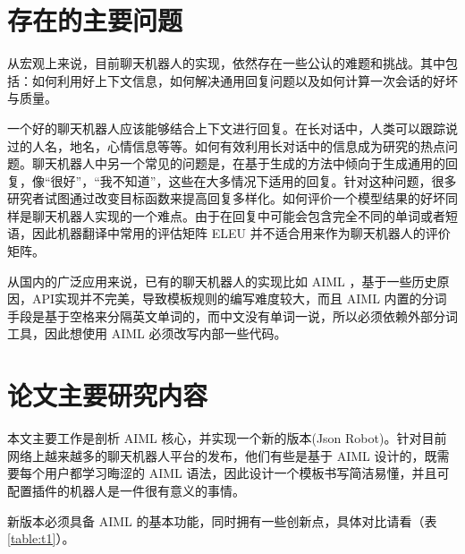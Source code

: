 \documentclass[bachelor,winfonts]{jnuthesis}
\begin{document}
\section{存在的主要问题}
从宏观上来说，目前聊天机器人的实现，依然存在一些公认的难题和挑战。其中包括：如何利用好上下文信息，如何解决通用回复问题以及如何计算一次会话的好坏与质量。

一个好的聊天机器人应该能够结合上下文进行回复。在长对话中，人类可以跟踪说过的人名，地名，心情信息等等。如何有效利用长对话中的信息成为研究的热点问题。聊天机器人中另一个常见的问题是，在基于生成的方法中倾向于生成通用的回复，像“很好”，“我不知道”，这些在大多情况下适用的回复。针对这种问题，很多研究者试图通过改变目标函数来提高回复多样化。如何评价一个模型结果的好坏同样是聊天机器人实现的一个难点。由于在回复中可能会包含完全不同的单词或者短语，因此机器翻译中常用的评估矩阵 ELEU 并不适合用来作为聊天机器人的评价矩阵。

从国内的广泛应用来说，已有的聊天机器人的实现比如 AIML ，基于一些历史原因，API实现并不完美，导致模板规则的编写难度较大，而且 AIML 内置的分词手段是基于空格来分隔英文单词的，而中文没有单词一说，所以必须依赖外部分词工具，因此想使用 AIML 必须改写内部一些代码。

\section{论文主要研究内容}
本文主要工作是剖析 AIML 核心，并实现一个新的版本(Json Robot)。针对目前网络上越来越多的聊天机器人平台的发布，他们有些是基于 AIML 设计的，既需要每个用户都学习晦涩的 AIML 语法，因此设计一个模板书写简洁易懂，并且可配置插件的机器人是一件很有意义的事情。

新版本必须具备 AIML 的基本功能，同时拥有一些创新点，具体对比请看（表\ref{table:t1}）。
\end{document}
